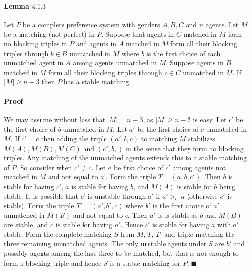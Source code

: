 \documentclass[letterpaper,12pt,oneside,onecolumn]{article}
\begin{document}
\paragraph{Lemma $4.1.3$} Let $P$ be a complete preference system with genders $A,B,C$ and $n$ agents. Let $M$ be a matching (not perfect) in $P$. Suppose that agents in $C$ matched in $M$ form no blocking triples in $P$ and agents in $A$ matched in $M$ form all their blocking triples through $b \in B$ unmatched in $M$ where $b$ is the first choice of each unmatched agent in $A$ among agents unmatched in $M$. Suppose agents in $B$ matched in $M$ form all their blocking triples through $c \in C$ unmatched in $M$. If $|M| \geq n-3$ then $P$ has a stable matching.
\paragraph{Proof}
We may assume without loss that $|M| = n-3$, as $|M| \geq n-2$ is easy. Let $c'$ be the first choice of $b$ unmatched in $M$. Let $a'$ be the first choice of $c$ unmatched in $M$. If $c' = c$ then adding the triple $(a', b,c)$ to matching $M$ stabilizes $M(A), M(B), M(C)$ and $(a', b, )$ in the sense that they form no blocking triples. Any matching of the unmatched agents extends this to a stable matching of $P$. So consider when $c' \neq c$. Let $a$ be first choice of $c'$ among agents not matched in $M$ and not equal to $a'$. Form the triple $T = (a, b, c')$. Then $b$ is stable for having $c'$, $a$ is stable for having $b$, and $M(A)$ is stable for $b$ being stable. It is possible that $c'$ is unstable through $a'$ if $a' >_{c'} a$ (otherwise $c'$ is stable). Form the triple $T' = (a', b', c)$ where $b'$ is the first choice of $a'$ unmatched in $M(B)$ and not equal to $b$. Then $a'$ is is stable as $b$ and $M(B)$ are stable, and $c$ is stable for having $a'$. Hence $c'$ is stable for having $a$ with $a'$ stable. Form the complete matching $S$ from $M$, $T$, $T'$ and triple matching the three remaining unmatched agents. The only unstable agents under $S$ are $b'$ and possibly agents among the last three to be matched, but that is not enough to form a blocking triple and hence $S$ is a stable matching for $P$. $\blacksquare$
\end{document}
